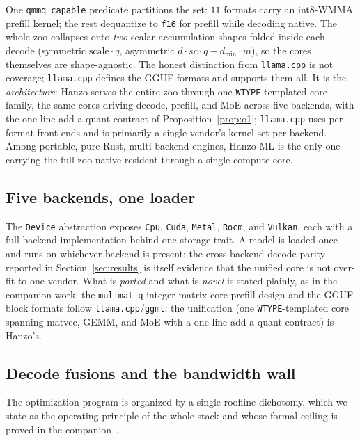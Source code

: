 \documentclass[11pt]{article}
\begin{document}
One \texttt{qmmq\_capable} predicate partitions the set: $11$ formats carry an int8-WMMA prefill
kernel; the rest dequantize to \texttt{f16} for prefill while decoding native. The whole zoo collapses
onto \emph{two} scalar accumulation shapes folded inside each decode (symmetric
$\text{scale}\cdot q$, asymmetric $d\cdot sc\cdot q - d_{\min}\cdot m$), so the cores themselves are
shape-agnostic. The honest distinction from \texttt{llama.cpp} is not coverage; \texttt{llama.cpp}
defines the GGUF formats and supports them all. It is the \emph{architecture}: Hanzo serves the
entire zoo through one \texttt{WTYPE}-templated core family, the same cores driving decode, prefill,
and MoE across five backends, with the one-line add-a-quant contract of
Proposition~\ref{prop:o1}; \texttt{llama.cpp} uses per-format front-ends and is primarily a single
vendor's kernel set per backend. Among portable, pure-Rust, multi-backend engines, Hanzo ML is the
only one carrying the full zoo native-resident through a single compute core.

\subsection{Five backends, one loader}
\label{sec:backends}

The \texttt{Device} abstraction exposes \texttt{Cpu}, \texttt{Cuda}, \texttt{Metal}, \texttt{Rocm},
and \texttt{Vulkan}, each with a full backend implementation behind one storage trait. A model is
loaded once and runs on whichever backend is present; the cross-backend decode parity reported in
Section~\ref{sec:results} is itself evidence that the unified core is not over-fit to one vendor.
What is \emph{ported} and what is \emph{novel} is stated plainly, as in the companion work: the
\texttt{mul\_mat\_q} integer-matrix-core prefill design and the GGUF block formats follow
\texttt{llama.cpp}/\texttt{ggml}; the unification (one \texttt{WTYPE}-templated core spanning matvec,
GEMM, and MoE with a one-line add-a-quant contract) is Hanzo's.

\subsection{Decode fusions and the bandwidth wall}
\label{sec:fusions}

The optimization program is organized by a single roofline dichotomy, which we state as the
operating principle of the whole stack and whose formal ceiling is proved in the
companion~\cite{hanzorocm,williams2009}.
\end{document}
